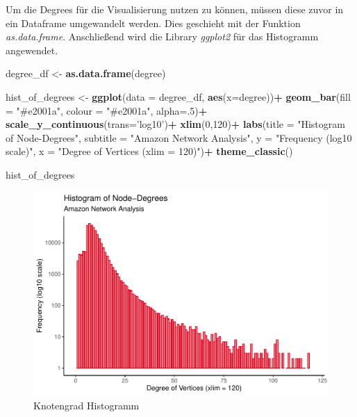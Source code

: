 \documentclass[
  12 pt,
]{article}
\newenvironment{Shaded}{\begin{snugshade}}{\end{snugshade}}
\newcommand{\DataTypeTok}[1]{\textcolor[rgb]{0.13,0.29,0.53}{#1}}
\newcommand{\DecValTok}[1]{\textcolor[rgb]{0.00,0.00,0.81}{#1}}
\newcommand{\KeywordTok}[1]{\textcolor[rgb]{0.13,0.29,0.53}{\textbf{#1}}}
\newcommand{\NormalTok}[1]{#1}
\newcommand{\OperatorTok}[1]{\textcolor[rgb]{0.81,0.36,0.00}{\textbf{#1}}}
\newcommand{\StringTok}[1]{\textcolor[rgb]{0.31,0.60,0.02}{#1}}
\begin{document}
Um die Degrees für die Visualisierung nutzen zu können, müssen diese
zuvor in ein Dataframe umgewandelt werden. Dies geschieht mit der
Funktion \emph{as.data.frame}. Anschließend wird die Library
\emph{ggplot2} für das Histogramm angewendet.

\begin{Shaded}
\begin{Highlighting}[]
\NormalTok{degree_df <-}\StringTok{ }\KeywordTok{as.data.frame}\NormalTok{(degree)}


\NormalTok{hist_of_degrees <-}\StringTok{ }\KeywordTok{ggplot}\NormalTok{(}\DataTypeTok{data =}\NormalTok{ degree_df, }\KeywordTok{aes}\NormalTok{(}\DataTypeTok{x=}\NormalTok{degree))}\OperatorTok{+}
\StringTok{  }\KeywordTok{geom_bar}\NormalTok{(}\DataTypeTok{fill =} \StringTok{"#e2001a"}\NormalTok{, }\DataTypeTok{colour =} \StringTok{"#e2001a"}\NormalTok{, }\DataTypeTok{alpha=}\NormalTok{.}\DecValTok{5}\NormalTok{)}\OperatorTok{+}
\StringTok{  }\KeywordTok{scale_y_continuous}\NormalTok{(}\DataTypeTok{trans=}\StringTok{'log10'}\NormalTok{)}\OperatorTok{+}
\StringTok{  }\KeywordTok{xlim}\NormalTok{(}\DecValTok{0}\NormalTok{,}\DecValTok{120}\NormalTok{)}\OperatorTok{+}
\StringTok{  }\KeywordTok{labs}\NormalTok{(}\DataTypeTok{title =} \StringTok{"Histogram of Node-Degrees"}\NormalTok{, }
       \DataTypeTok{subtitle =} \StringTok{"Amazon Network Analysis"}\NormalTok{, }
       \DataTypeTok{y =} \StringTok{"Frequency (log10 scale)"}\NormalTok{, }
       \DataTypeTok{x =} \StringTok{"Degree of Vertices (xlim = 120)"}\NormalTok{)}\OperatorTok{+}
\StringTok{  }\KeywordTok{theme_classic}\NormalTok{()}

\NormalTok{hist_of_degrees}
\end{Highlighting}
\end{Shaded}

\begin{figure}
\centering
\includegraphics{Assignment_files/figure-latex/viz-1.pdf}
\caption{Knotengrad Histogramm}
\end{figure}
\end{document}
